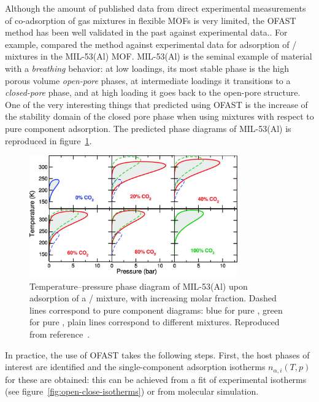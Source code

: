 \documentclass[thesis]{subfiles}
\begin{document}
Although the amount of published data from direct experimental measurements of
co-adsorption of gas mixtures in flexible MOFs is very limited, the OFAST method
has been well validated in the past against experimental data.\cite{Ortiz2011,
Hoffmann2011, Zang2011}. For example, \citeauthor{Ortiz2011}\cite{Ortiz2011}
compared the method against experimental data for adsorption of
/ mixtures in the MIL-53(Al) MOF. MIL-53(Al) is the seminal
example of material with a \emph{breathing} behavior: at low loadings, its most
stable phase is the high porous volume \emph{open-pore} phases, at intermediate
loadings it transitions to a \emph{closed-pore} phase, and at high loading it
goes back to the open-pore structure. One of the very interesting things that
\citeauthor{Ortiz2011} predicted using OFAST is the increase of the stability
domain of the closed pore phase when using mixtures with respect to pure
component adsorption. The predicted phase diagrams of MIL-53(Al) is reproduced
in figure~\ref{fig:ofast:ortiz}.

\begin{figure}[ht]
    \centering
    \includegraphics[width=0.8\textwidth]{figures/cited/ofast-phase-diagram-rotated}
    \caption{Temperature–pressure phase diagram of MIL-53(Al) upon adsorption
    of a / mixture, with increasing  molar fraction.
    Dashed lines correspond to pure component diagrams: blue for pure ,
    green for pure , plain lines correspond to different mixtures.
    Reproduced from reference~\cite{Ortiz2011}.}
    \label{fig:ofast:ortiz}
\end{figure}

In practice, the use of OFAST takes the following steps. First, the host
phases of interest are identified and the single-component adsorption isotherms
$n_{\alpha,i}(T, p)$ for these are obtained: this can be achieved from a fit of
experimental isotherms (see figure~\ref{fig:open-close-isotherms}) or from
molecular simulation.
\end{document}
